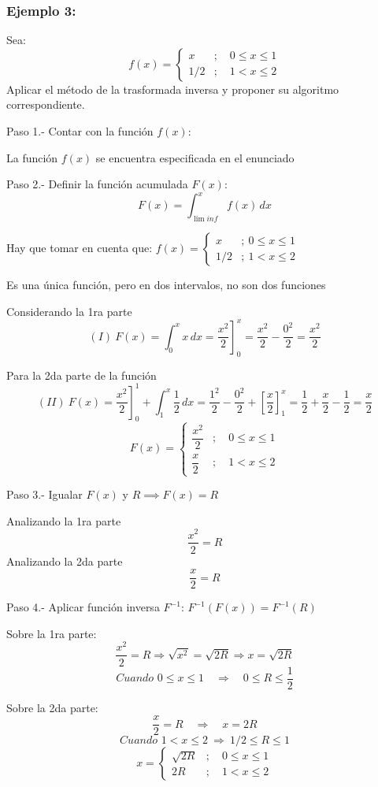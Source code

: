 \documentclass[11pt,letterpaper]{report}
\begin{document}
\subsubsection*{Ejemplo 3:}

Sea:
\[
f(x) = \begin{cases}
x & ;\quad 0 \leq x \leq 1\\
1/2 & ;\quad 1 < x \leq 2
\end{cases}
\]
Aplicar el método de la trasformada inversa y proponer su algoritmo correspondiente.

Paso 1.- Contar con la función $f(x)$:

La función $f(x)$ se encuentra especificada en el enunciado

Paso 2.- Definir la función acumulada $F(x)$:
\[
F(x) = \int_{\lim inf}^x f(x)\,dx
\]

Hay que tomar en cuenta que: $f(x) = \begin{cases} x & ;\ 0 \leq x \leq 1\\ 1/2 & ;\ 1 < x \leq 2\end{cases}$

Es una única función, pero en dos intervalos, no son dos funciones

Considerando la 1ra parte
\[
(I)\ F(x) = \int_0^x x\,dx = \left.\frac{x^2}{2}\right]_0^x = \frac{x^2}{2} - \frac{0^2}{2} = \frac{x^2}{2}
\]

Para la 2da parte de la función
\[
(II)\ F(x) = \left.\frac{x^2}{2}\right]_0^1 + \int_1^x \frac{1}{2}\,dx = \frac{1^2}{2} - \frac{0^2}{2} + \left[\frac{x}{2}\right]_1^x = \frac{1}{2} + \frac{x}{2} - \frac{1}{2} = \frac{x}{2}
\]
\[
F(x) = \begin{cases}
\dfrac{x^2}{2} & ;\quad 0 \leq x \leq 1\\[0.3cm]
\dfrac{x}{2} & ;\quad 1 < x \leq 2
\end{cases}
\]

Paso 3.- Igualar $F(x)$ y $R \implies F(x) = R$

Analizando la 1ra parte
\[
\frac{x^2}{2} = R
\]
Analizando la 2da parte
\[
\frac{x}{2} = R
\]

Paso 4.- Aplicar función inversa $F^{-1}$: $F^{-1}(F(x)) = F^{-1}(R)$

Sobre la 1ra parte:
\[
\frac{x^2}{2} = R \Rightarrow \sqrt{x^2} = \sqrt{2R} \Rightarrow x = \sqrt{2R}
\]
\[
\textit{Cuando } 0 \leq x \leq 1 \quad\Rightarrow\quad 0 \leq R \leq \frac{1}{2}
\]

Sobre la 2da parte:
\[
\frac{x}{2} = R \quad\Rightarrow\quad x = 2R
\]
\[
\textit{Cuando } 1 < x \leq 2 \ \Rightarrow\ 1/2 \leq R \leq 1
\]
\[
x = \begin{cases}
\sqrt{2R} & ;\quad 0 \leq x \leq 1\\
2R & ;\quad 1 < x \leq 2
\end{cases}
\]
\end{document}
